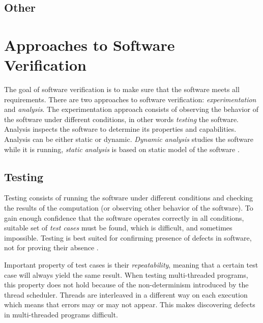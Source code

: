 \todo{}

\subsection{Other}


\section{Approaches to Software Verification}
\label{approachesToSwVerification}


The goal of software verification is to make sure that the software meets all
requirements. There are two approaches to software verification:
\emph{experimentation} and \emph{analysis}. The experimentation approach
consists of observing the behavior of the software under different conditions,
in other words \emph{testing} the software. Analysis inspects the software to
determine its properties and capabilities. Analysis can be either static or
dynamic. \emph{Dynamic analysis} studies the software while it is running,
\emph{static analysis} is based on static model of the software
\cite{fundamentals}.

\subsection{Testing}

Testing consists of running the software under different conditions and
checking the results of the computation (or observing other behavior of the
software). To gain enough confidence that the software operates correctly in all
conditions, suitable set of \emph{test cases} must be found, which is difficult,
and sometimes impossible. Testing is best suited for confirming presence of
defects in software, not for proving their absence \cite{fundamentals}.

Important property of test cases is their \emph{repeatability}, meaning that a
certain test case will always yield the same result. When testing multi-threaded
programs, this property does not hold because of the non-determinism introduced
by the thread scheduler. Threads are interleaved in a different way on each
execution which means that errors may or may not appear. This makes discovering
defects in multi-threaded programs difficult.

